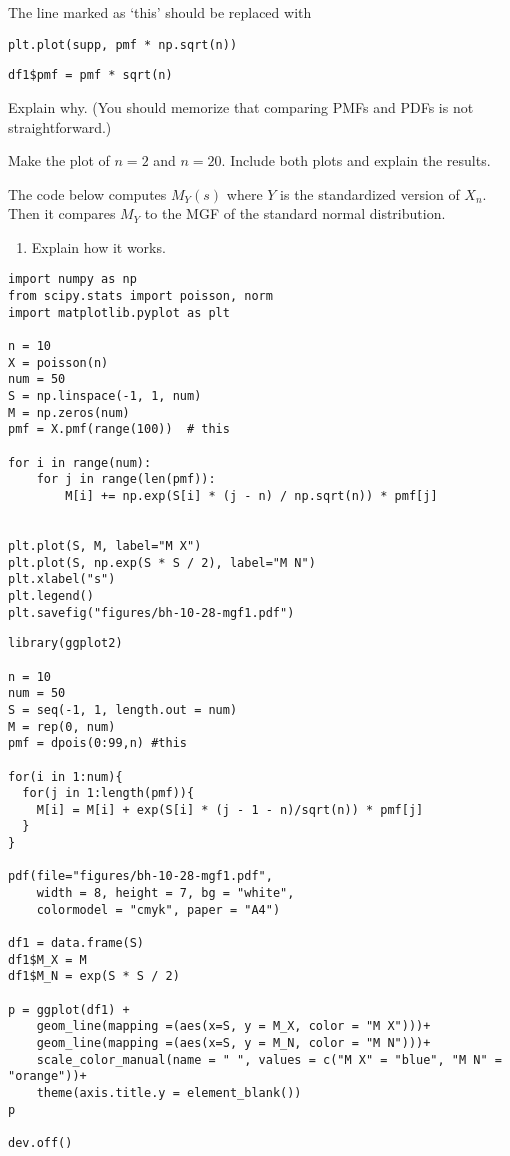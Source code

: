 \begin{exercise}
The line  marked as `this' should be replaced with
\begin{verbatim}
plt.plot(supp, pmf * np.sqrt(n))
\end{verbatim}

\begin{verbatim}
df1$pmf = pmf * sqrt(n)
\end{verbatim}
Explain why.  (You should memorize  that comparing PMFs and PDFs is not straightforward.)
\end{exercise}


\begin{exercise}
Make the plot of $n=2$ and $n=20$. Include both plots and explain the results.
\end{exercise}

\begin{exercise}
The code below computes $M_{Y}(s)$ where $Y$ is the standardized version of $X_{n}$. Then it compares $M_Y$ to the MGF of the standard normal distribution.
\begin{enumerate}
\item Explain how it works.
\end{enumerate}
\end{exercise}

\begin{verbatim}
import numpy as np
from scipy.stats import poisson, norm
import matplotlib.pyplot as plt

n = 10
X = poisson(n)
num = 50
S = np.linspace(-1, 1, num)
M = np.zeros(num)
pmf = X.pmf(range(100))  # this

for i in range(num):
    for j in range(len(pmf)):
        M[i] += np.exp(S[i] * (j - n) / np.sqrt(n)) * pmf[j]


plt.plot(S, M, label="M X")
plt.plot(S, np.exp(S * S / 2), label="M N")
plt.xlabel("s")
plt.legend()
plt.savefig("figures/bh-10-28-mgf1.pdf")
\end{verbatim}

\begin{verbatim}
library(ggplot2)

n = 10
num = 50
S = seq(-1, 1, length.out = num)
M = rep(0, num)
pmf = dpois(0:99,n) #this

for(i in 1:num){
  for(j in 1:length(pmf)){
    M[i] = M[i] + exp(S[i] * (j - 1 - n)/sqrt(n)) * pmf[j]
  }
}

pdf(file="figures/bh-10-28-mgf1.pdf",
    width = 8, height = 7, bg = "white",
    colormodel = "cmyk", paper = "A4")

df1 = data.frame(S)
df1$M_X = M
df1$M_N = exp(S * S / 2)

p = ggplot(df1) +
    geom_line(mapping =(aes(x=S, y = M_X, color = "M X")))+
    geom_line(mapping =(aes(x=S, y = M_N, color = "M N")))+
    scale_color_manual(name = " ", values = c("M X" = "blue", "M N" = "orange"))+
    theme(axis.title.y = element_blank())
p

dev.off()
\end{verbatim}

